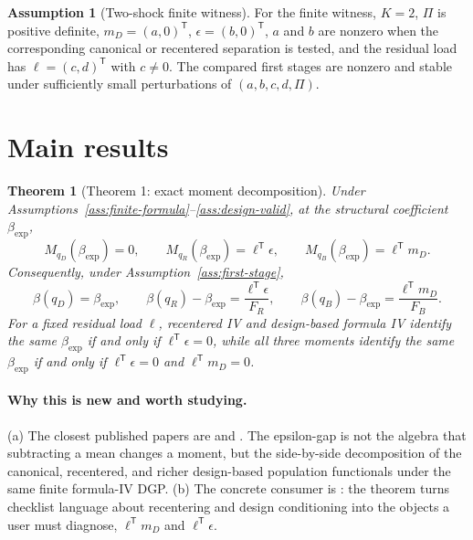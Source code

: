 \documentclass[11pt]{article}
\newcommand{\transpose}{\mathsf{T}}
\theoremstyle{definition}
\newtheorem{assumption}{Assumption}
\theoremstyle{plain}
\newtheorem{theorem}{Theorem}
\theoremstyle{remark}
\begin{document}
\begin{assumption}[Two-shock finite witness]\label{ass:two-shock}
For the finite witness, \(K=2\), \(\Pi\) is positive definite, \(m_D=(a,0)^\transpose\), \(\epsilon=(b,0)^\transpose\), \(a\) and \(b\) are nonzero when the corresponding canonical or recentered separation is tested, and the residual load has \(\ell=(c,d)^\transpose\) with \(c\ne0\).  The compared first stages are nonzero and stable under sufficiently small perturbations of \((a,b,c,d,\Pi)\).
\end{assumption}

\section{Main results}
\begin{theorem}[Theorem 1: exact moment decomposition]\label{thm:moment-decomp}
Under Assumptions~\ref{ass:finite-formula}--\ref{ass:design-valid}, at the structural coefficient \(\beta_{\exp}\),
\[
  M_{q_D}(\beta_{\exp})=0,\qquad
  M_{q_R}(\beta_{\exp})=\ell^\transpose\epsilon,\qquad
  M_{q_B}(\beta_{\exp})=\ell^\transpose m_D.
\]
Consequently, under Assumption~\ref{ass:first-stage},
\[
  \beta(q_D)=\beta_{\exp},\qquad
  \beta(q_R)-\beta_{\exp}=\frac{\ell^\transpose\epsilon}{F_R},\qquad
  \beta(q_B)-\beta_{\exp}=\frac{\ell^\transpose m_D}{F_B}.
\]
For a fixed residual load \(\ell\), recentered IV and design-based formula IV identify the same \(\beta_{\exp}\) if and only if \(\ell^\transpose\epsilon=0\), while all three moments identify the same \(\beta_{\exp}\) if and only if \(\ell^\transpose\epsilon=0\) and \(\ell^\transpose m_D=0\).
\end{theorem}
\paragraph{Why this is new and worth studying.}
(a) The closest published papers are \citet{BorusyakHullJaravel2022REStud} and \citet{BorusyakHull2023Econometrica}.  The epsilon-gap is not the algebra that subtracting a mean changes a moment, but the side-by-side decomposition of the canonical, recentered, and richer design-based population functionals under the same finite formula-IV DGP.  (b) The concrete consumer is \citet{BorusyakHullJaravel2025JEP}: the theorem turns checklist language about recentering and design conditioning into the objects a user must diagnose, \(\ell^\transpose m_D\) and \(\ell^\transpose\epsilon\).
\end{document}
